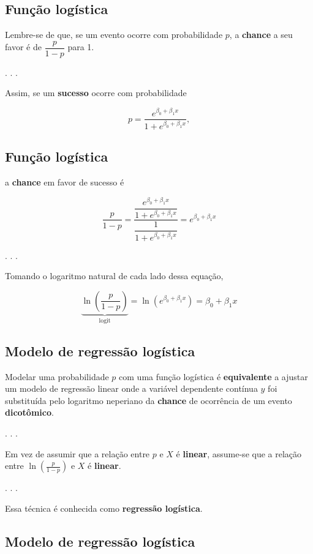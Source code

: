 \documentclass[
  letterpaper,
  DIV=11,
  numbers=noendperiod]{scrartcl}
\begin{document}
\subsection{Função logística}\label{funuxe7uxe3o-loguxedstica-3}

Lembre-se de que, se um evento ocorre com probabilidade \(p\), a
\textbf{chance} a seu favor é de \(\dfrac{p}{1-p}\) para 1.

. . .

Assim, se um \textbf{sucesso} ocorre com probabilidade

\[p = \dfrac{e^{\beta_0 + \beta_1 x}}{1 + e^{\beta_0 + \beta_1 x}},\]

\subsection{Função logística}\label{funuxe7uxe3o-loguxedstica-4}

a \textbf{chance} em favor de sucesso é

\[\dfrac{p}{1-p} = \dfrac{\dfrac{e^{\beta_0 + \beta_1 x}}{1 + e^{\beta_0 + \beta_1 x}}}{\dfrac{1}{1 + e^{\beta_0 + \beta_1 x}}} = e^{\beta_0 + \beta_1 x}\]

. . .

Tomando o logaritmo natural de cada lado dessa equação,

\[\underbrace{\ln\left ( \frac{p}{1-p} \right)}_\text{logit} = \ln(e^{\beta_0 + \beta_1 x}) = \beta_0 + \beta_1 x\]

\subsection{Modelo de regressão
logística}\label{modelo-de-regressuxe3o-loguxedstica}

Modelar uma probabilidade \(p\) com uma função logística é
\textbf{equivalente} a ajustar um modelo de regressão linear onde a
variável dependente contínua \(y\) foi substituída pelo logaritmo
neperiano da \textbf{chance} de ocorrência de um evento
\textbf{dicotômico}.

. . .

Em vez de assumir que a relação entre \(p\) e \(X\) é \textbf{linear},
assume-se que a relação entre \(\ln\left ( \frac{p}{1-p} \right)\) e
\(X\) é \textbf{linear}.

. . .

Essa técnica é conhecida como \textbf{regressão logística}.

\subsection{Modelo de regressão
logística}\label{modelo-de-regressuxe3o-loguxedstica-1}
\end{document}

